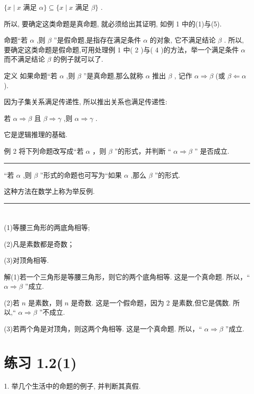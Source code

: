 \documentclass[10pt]{article}
\newcommand{\HRule}{\begin{center}\rule{0.9\linewidth}{0.2mm}\end{center}}
\begin{document}
\(\{ x \mid  x\) 满足 \(\alpha \}  \subseteq  \{ x \mid  x\) 满足 \(\beta \}\) .

所以, 要确定这类命题是真命题, 就必须给出其证明, 如例 1 中的(1)与(5).

命题“若 \(\alpha\) ,则 \(\beta\) ”是假命题,是指存在满足条件 \(\alpha\) 的对象, 它不满足结论 \(\beta\) . 所以,要确定这类命题是假命题,可用处理例 1 中( 2 )与( 4 )的方法，举一个满足条件 \(\alpha\) 而不满足结论 \(\beta\) 的例子就可以了.

定义 如果命题“若 \(\alpha\) ,则 \(\beta\) ”是真命题,那么就称 \(\alpha\) 推出 \(\beta\) , 记作 \(\alpha  \Rightarrow  \beta\) (或 \(\beta  \Leftarrow  \alpha\) ).

因为子集关系满足传递性, 所以推出关系也满足传递性:

若 \(\alpha  \Rightarrow  \beta\) 且 \(\beta  \Rightarrow  \gamma\) ,则 \(\alpha  \Rightarrow  \gamma\) .

它是逻辑推理的基础.

例 2 将下列命题改写成“若 \(\alpha\) ，则 \(\beta\) ”的形式，并判断 “ \(\alpha  \Rightarrow  \beta\) ” 是否成立.



\HRule

“若 \(\alpha\) ,则 \(\beta\) ”形式的命题也可写为“如果 \(\alpha\) ,那么 \(\beta\) ”的形式.

这种方法在数学上称为举反例.

\HRule

\section*{}

(1)等腰三角形的两底角相等;

(2)凡是素数都是奇数；

(3)对顶角相等.

解(1)若一个三角形是等腰三角形，则它的两个底角相等. 这是一个真命题. 所以，“ \(\alpha  \Rightarrow  \beta\) ”成立.

(2)若 \(n\) 是素数，则 \(n\) 是奇数. 这是一个假命题，因为 2 是素数,但它是偶数. 所以,“ \(\alpha  \Rightarrow  \beta\) ”不成立.

(3)若两个角是对顶角，则这两个角相等. 这是一个真命题. 所以，“ \(\alpha  \Rightarrow  \beta\) ”成立.

\section*{练习 1.2(1)}

1. 举几个生活中的命题的例子, 并判断其真假.
\end{document}
